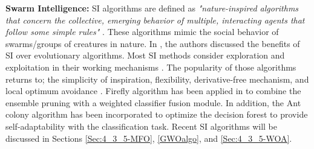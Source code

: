\textbf{Swarm Intelligence:}  SI algorithms are defined as \textit{"nature-inspired algorithms that concern the collective, emerging behavior of multiple, interacting agents that follow some simple rules"} \cite{hassanien2018}. These algorithms mimic the social behavior of swarms/groups of creatures in nature.  In \cite{mirjalili2014}, the authors discussed the benefits of SI over evolutionary algorithms.  Most SI methods consider exploration and exploitation in their working mechanisms \cite{mirjalili2010}. The popularity of those algorithms returns to; the simplicity of inspiration, flexibility, derivative-free mechanism, and local optimum avoidance \cite{mirjalili2014}. Firefly algorithm has been applied in \cite{krawczyk2015} to combine the ensemble pruning with a weighted classifier fusion module. In addition, the Ant colony algorithm has been incorporated to optimize the decision forest \cite{kozak2015} to provide self-adaptability with the classification task. Recent SI algorithms will be discussed in Sections \ref{Sec:4_3_5-MFO}, \ref{GWOalgo}, and \ref{Sec:4_3_5-WOA}.







